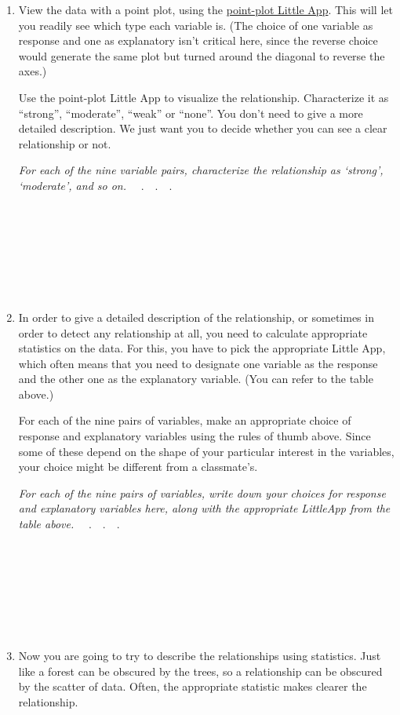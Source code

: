 \documentclass[nofonts,]{tufte-handout}
\begin{document}
\begin{enumerate}
\def\labelenumi{\arabic{enumi}.}
\item
  View the data with a point plot, using the
  \href{https://dtkaplan.shinyapps.io/LA_point_plot/}{point-plot Little
  App}. This will let you readily see which type each variable is. (The
  choice of one variable as response and one as explanatory isn't
  critical here, since the reverse choice would generate the same plot
  but turned around the diagonal to reverse the axes.)

  Use the point-plot Little App to visualize the relationship.
  Characterize it as ``strong'', ``moderate'', ``weak'' or ``none''. You
  don't need to give a more detailed description. We just want you to
  decide whether you can see a clear relationship or not.

  \emph{For each of the nine variable pairs, characterize the
  relationship as `strong', `moderate', and so on.} ~~.~~.~~. ~

  ~

  ~

  ~

  ~
\item
  In order to give a detailed description of the relationship, or
  sometimes in order to detect any relationship at all, you need to
  calculate appropriate statistics on the data. For this, you have to
  pick the appropriate Little App, which often means that you need to
  designate one variable as the response and the other one as the
  explanatory variable. (You can refer to the table above.)

  For each of the nine pairs of variables, make an appropriate choice of
  response and explanatory variables using the rules of thumb above.
  Since some of these depend on the shape of your particular interest in
  the variables, your choice might be different from a classmate's.

  \emph{For each of the nine pairs of variables, write down your choices
  for response and explanatory variables here, along with the
  appropriate LittleApp from the table above.} ~~.~~.~~. ~

  ~

  ~

  ~

  ~
\item
  Now you are going to try to describe the relationships using
  statistics. Just like a forest can be obscured by the trees, so a
  relationship can be obscured by the scatter of data. Often, the
  appropriate statistic makes clearer the relationship.


\end{enumerate}
\end{document}
